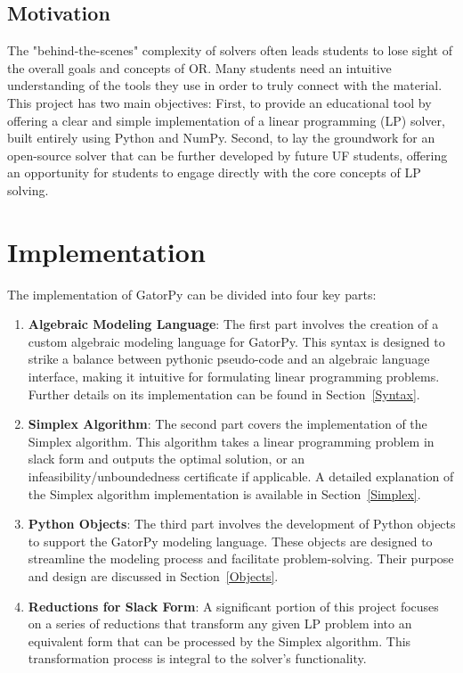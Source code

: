 \documentclass[conference]{IEEEtran}
\begin{document}
\subsection{Motivation}
The "behind-the-scenes" complexity of solvers often leads students to lose sight of the overall goals and concepts of OR. Many students need an intuitive understanding of the tools they use in order to truly connect with the material. 
This project has two main objectives: First, to provide an educational tool by offering a clear and simple implementation of a linear programming (LP) solver, built entirely using Python and NumPy. 
Second, to lay the groundwork for an open-source solver that can be further developed by future UF students, offering an opportunity for students to engage directly with the core concepts of LP solving.
\section{Implementation}
\label{sse:implementation}
The implementation of GatorPy can be divided into four key parts:

\begin{enumerate}
    \item \textbf{Algebraic Modeling Language}: The first part involves the creation of a custom algebraic modeling language for GatorPy. 
    This syntax is designed to strike a balance between pythonic pseudo-code and an algebraic language interface, making it intuitive for formulating linear programming problems. 
    Further details on its implementation can be found in Section~\ref{Syntax}.
    
    \item \textbf{Simplex Algorithm}: The second part covers the implementation of the Simplex algorithm. 
    This algorithm takes a linear programming problem in slack form and outputs the optimal solution, or an infeasibility/unboundedness certificate if applicable. 
    A detailed explanation of the Simplex algorithm implementation is available in Section~\ref{Simplex}.
    
    \item \textbf{Python Objects}: The third part involves the development of Python objects to support the GatorPy modeling language. 
    These objects are designed to streamline the modeling process and facilitate problem-solving. 
    Their purpose and design are discussed in Section~\ref{Objects}.
    
    \item \textbf{Reductions for Slack Form}: A significant portion of this project focuses on a series of reductions that transform any given LP problem into an equivalent form that can be processed by the Simplex algorithm. 
    This transformation process is integral to the solver's functionality.
\end{enumerate}
\end{document}
